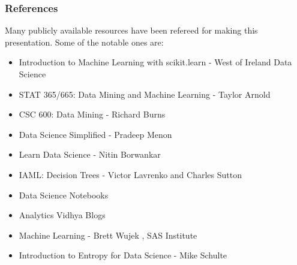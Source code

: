 \begin{frame}\frametitle{References}

Many publicly available resources have been refereed for making this presentation. Some of the notable ones are:
\footnotesize
\begin{itemize}
\item Introduction to Machine Learning with scikit.learn - West of Ireland Data Science
\item STAT 365/665: Data Mining and Machine Learning - Taylor Arnold
\item CSC 600: Data Mining - Richard Burns
\item Data Science Simplified - Pradeep Menon %
\item Learn Data Science - Nitin Borwankar %
\item IAML: Decision Trees	- Victor Lavrenko and Charles Sutton	
\item Data Science Notebooks %
\item Analytics Vidhya Blogs %
\item Machine Learning - Brett Wujek , SAS Institute
\item Introduction to Entropy for Data Science - Mike Schulte
\end{itemize}
\end{frame}

